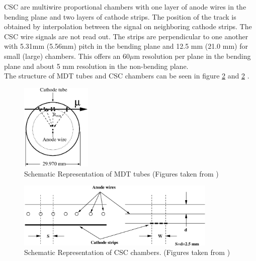 \indent CSC are multiwire proportional chambers with one layer of anode wires in the bending plane and two layers of cathode strips. The position of the track is obtained by interpolation between the signal on neighboring cathode strips. The CSC wire signals are not read out. The strips are perpendicular to one another with 5.31mm (5.56mm) pitch in the bending plane and 12.5 mm (21.0 mm) for small (large) chambers.  This offers an $60 \mu$m resolution per plane in the bending plane and about 5 mm resolution in the non-bending plane. \\

\indent The structure of MDT tubes and CSC chambers can be seen in figure \ref{LHC:fig:MDT} and \ref{LHC:fig:MDT} . \\

\begin{figure}[h!]
\centering
\includegraphics[width=0.30\textwidth, angle=0]{figures/LHC_ATLAS/MDT_tube_cross_section.eps}
\caption{ Schematic Representation of MDT tubes (Figures taken from \cite{ATLAS_JINST}) \label{LHC:fig:MDT}}
\end{figure}

\begin{figure}[h!]
\centering
\includegraphics[width=0.85\textwidth, angle=0]{figures/LHC_ATLAS/CSC_structure.eps}
\caption{ Schematic Representation of CSC chambers. (Figures taken from \cite{ATLAS_JINST}) \label{LHC:fig:MDT}}
\end{figure}


